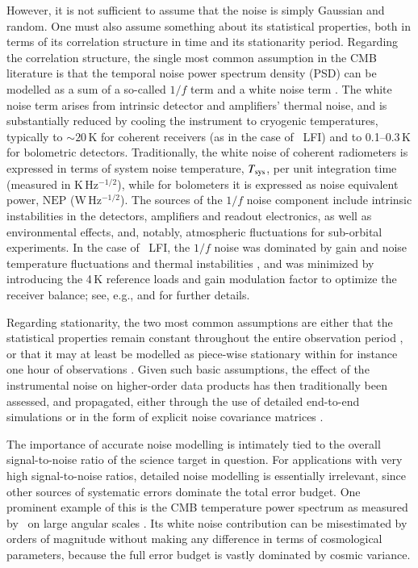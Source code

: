 \documentclass[twocolumn]{aa}
\begin{document}
However, it is not sufficient to assume that the noise is simply
Gaussian and random. One must also assume something about its
statistical properties, both in terms of its correlation structure in
time and its stationarity period. Regarding the correlation structure,
the single most common assumption in the CMB literature is that the
temporal noise power spectrum density (PSD) can be modelled as a sum
of a so-called $1/f$ term and a white noise term
\citep[e.g.,][]{bennett2012,planck2016-l02,planck2016-l03}. The white
noise term arises from intrinsic detector and amplifiers' thermal
noise, and is substantially reduced by cooling the instrument to
cryogenic temperatures, typically to $\sim$$20$\,K for coherent
receivers (as in the case of \Planck\ LFI) and to 0.1--0.3\,K for
bolometric detectors. Traditionally, the white noise of coherent
radiometers is expressed in terms of system noise temperature, $T_{\rm
  sys}$, per unit integration time (measured in K\,Hz$^{-1/2}$), while
for bolometers it is expressed as noise equivalent power,
$\mathrm{NEP}$ (W\,Hz$^{-1/2}$). The sources of the $1/f$ noise
component include intrinsic instabilities in the detectors, amplifiers
and readout electronics, as well as environmental effects, and,
notably, atmospheric fluctuations for sub-orbital experiments. In the
case of \Planck\ LFI, the $1/f$ noise was dominated by gain and noise
temperature fluctuations and thermal instabilities
\citep{planck2016-l02}, and was minimized by introducing the 4\,K
reference loads and gain modulation factor to optimize the receiver
balance; see, e.g., \citet{planck2013-p02,planck2014-a03} and
\citet{bp01} for further details.

Regarding stationarity, the two most common assumptions are either
that the statistical properties remain constant throughout the entire
observation period \citep[e.g.,][]{planck2016-l02}, or that it may at
least be modelled as piece-wise stationary within for instance one
hour of observations \citep[e.g.,][]{quiet:2011}. Given such basic
assumptions, the effect of the instrumental noise on higher-order data
products has then traditionally been assessed, and propagated, either
through the use of detailed end-to-end simulations
\citep[e.g.,][]{planck2014-a14} or in the form of explicit noise
covariance matrices
\citep[e.g.,][]{tegmark1997,page2007,planck2016-l05}.

The importance of accurate noise modelling is intimately tied to the
overall signal-to-noise ratio of the science target in question. For
applications with very high signal-to-noise ratios, detailed noise
modelling is essentially irrelevant, since other sources of systematic
errors dominate the total error budget. One prominent example of this
is the CMB temperature power spectrum as measured by \Planck\ on large
angular scales \citep{planck2016-l04,planck2016-l05}. Its white noise
contribution can be misestimated by orders of magnitude without making
any difference in terms of cosmological parameters, because the full
error budget is vastly dominated by cosmic variance.
\end{document}
